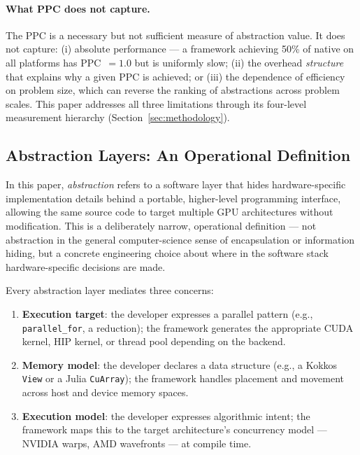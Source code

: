\paragraph{What PPC does not capture.}
The PPC is a necessary but not sufficient measure of abstraction value. It
does not capture: (i) absolute performance --- a framework achieving 50\% of
native on all platforms has PPC~$= 1.0$ but is uniformly slow; (ii) the
overhead \emph{structure} that explains why a given PPC is achieved; or
(iii) the dependence of efficiency on problem size, which can reverse the
ranking of abstractions across problem scales. This paper addresses all
three limitations through its four-level measurement hierarchy
(Section~\ref{sec:methodology}).

\subsection{Abstraction Layers: An Operational Definition}
\label{subsec:abstraction}

In this paper, \emph{abstraction} refers to a software layer that hides
hardware-specific implementation details behind a portable, higher-level
programming interface, allowing the same source code to target multiple GPU
architectures without modification. This is a deliberately narrow, operational
definition --- not abstraction in the general computer-science sense of
encapsulation or information hiding, but a concrete engineering choice about
where in the software stack hardware-specific decisions are made.

Every abstraction layer mediates three concerns:

\begin{enumerate}
    \item \textbf{Execution target}: the developer expresses a parallel
    pattern (e.g., \texttt{parallel\_for}, a reduction); the framework
    generates the appropriate CUDA kernel, HIP kernel, or thread pool
    depending on the backend.

    \item \textbf{Memory model}: the developer declares a data structure
    (e.g., a Kokkos \texttt{View} or a Julia \texttt{CuArray}); the
    framework handles placement and movement across host and device
    memory spaces.

    \item \textbf{Execution model}: the developer expresses algorithmic
    intent; the framework maps this to the target architecture's
    concurrency model --- NVIDIA warps, AMD wavefronts --- at compile time.
\end{enumerate}

